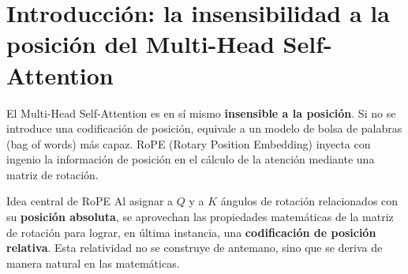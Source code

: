 \section{Introducción: la insensibilidad a la posición del Multi-Head Self-Attention}

El Multi-Head Self-Attention es en sí mismo \textbf{insensible a la posición}. Si no se introduce una codificación de posición, equivale a un modelo de bolsa de palabras (bag of words) más capaz. RoPE (Rotary Position Embedding) inyecta con ingenio la información de posición en el cálculo de la atención mediante una matriz de rotación.

\begin{importantbox}{Idea central de RoPE}
Al asignar a $Q$ y a $K$ ángulos de rotación relacionados con su \textbf{posición absoluta}, se aprovechan las propiedades matemáticas de la matriz de rotación para lograr, en última instancia, una \textbf{codificación de posición relativa}. Esta relatividad no se construye de antemano, sino que se deriva de manera natural en las matemáticas.
\end{importantbox}

